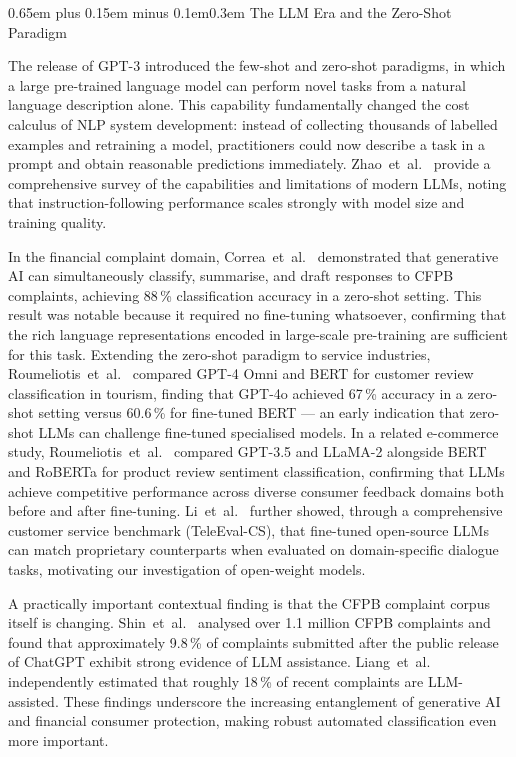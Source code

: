 \documentclass[10pt,a4paper,twocolumn]{article}
\makeatletter
\renewcommand\subsection{\@startsection{subsection}{2}{0pt}%
  {0.65em plus 0.15em minus 0.1em}{0.3em}%
  {\normalfont\normalsize\itshape}}
\makeatother
\begin{document}
\subsection{The LLM Era and the Zero-Shot Paradigm}

The release of GPT-3 \cite{brown2020gpt3} introduced the few-shot and
zero-shot paradigms, in which a large pre-trained language model can
perform novel tasks from a natural language description alone. This
capability fundamentally changed the cost calculus of NLP system
development: instead of collecting thousands of labelled examples and
retraining a model, practitioners could now describe a task in a
prompt and obtain reasonable predictions immediately. Zhao~et~al.\
\cite{zhao2023survey} provide a comprehensive survey of the capabilities
and limitations of modern LLMs, noting that instruction-following
performance scales strongly with model size and training quality.

In the financial complaint domain, Correa~et~al.\ \cite{correa2024genai}
demonstrated that generative AI can simultaneously classify, summarise,
and draft responses to CFPB complaints, achieving 88\,\% classification
accuracy in a zero-shot setting. This result was notable because it
required no fine-tuning whatsoever, confirming that the rich language
representations encoded in large-scale pre-training are sufficient for
this task. Extending the zero-shot paradigm to service industries,
Roumeliotis~et~al.\ \cite{roumeliotis2024tourism} compared GPT-4 Omni
and BERT for customer review classification in tourism, finding that
GPT-4o achieved 67\,\% accuracy in a zero-shot setting versus 60.6\,\%
for fine-tuned BERT --- an early indication that zero-shot LLMs can
challenge fine-tuned specialised models.
In a related e-commerce study, Roumeliotis~et~al.\ \cite{roumeliotis2024ecommerce}
compared GPT-3.5 and LLaMA-2 alongside BERT and RoBERTa for product review
sentiment classification, confirming that LLMs achieve competitive performance
across diverse consumer feedback domains both before and after fine-tuning.
Li~et~al.\
\cite{li2024customerservice} further showed, through a comprehensive
customer service benchmark (TeleEval-CS), that fine-tuned open-source
LLMs can match proprietary counterparts when evaluated on
domain-specific dialogue tasks, motivating our investigation of
open-weight models.

A practically important contextual finding is that the CFPB complaint
corpus itself is changing. Shin~et~al.\ \cite{shin2025llmwritten}
analysed over 1.1 million CFPB complaints and found that approximately
9.8\,\% of complaints submitted after the public release of ChatGPT
exhibit strong evidence of LLM assistance. Liang~et~al.\
\cite{liang2025cfpb} independently estimated that roughly 18\,\% of
recent complaints are LLM-assisted. These findings underscore the
increasing entanglement of generative AI and financial consumer
protection, making robust automated classification even more important.
\end{document}
